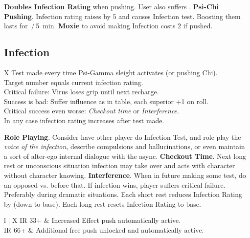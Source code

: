 \begin{itemize}
    \itembox \textbf{Doubles Infection Rating} when pushing. User also suffers .
    \itembox \textbf{Psi-Chi Pushing}. Infection rating raises by \num{5} and causes Infection test. Boosting them lasts for \,/\,\SI{5}{min}.
    \itembox \textbf{Moxie} to avoid making Infection costs \num{2} if pushed.
\end{itemize}


\bigskip

\subsection*{Infection}


\begin{eptable}{ X }
   Test made every time Psi-Gamma sleight activates (or pushing Chi).\\
   Target number equals current infection rating.\\
   Critical failure: Virus loses grip until next recharge.\\
   Success is bad: Suffer influence as in table, each superior +\num{1} on roll.\\
   Critical success even worse: \textit{Checkout time} or \textit{Interference}.\\
   In any case infection rating increases after test made.\\
\end{eptable}

\begin{itemize}
    \itembox \textbf{Role Playing}. Consider have other player do Infection Test, and role play the \textit{voice of the infection}, describe compulsions and hallucinations, or even maintain a sort of alter-ego internal dialogue with the async.
    \itembox \textbf{Checkout Time}. Next long rest or unconscious situation infection may take over and acts with character without character knowing.
    \itembox \textbf{Interference}. When in future making some test, do an opposed  vs.  before that. If infection wins, player suffers critical failure. Preferably during dramatic situations.
    \itembox Each short rest reduces Infection Rating by  (down to base). Each long rest resets Infection Rating to base.
\end{itemize}

\bigskip

\begin{eptable}{ l | X }
   IR 33+ & Increased Effect push automatically active.\\
   IR 66+ & Additional free push unlocked and automatically active.\\
\end{eptable}

